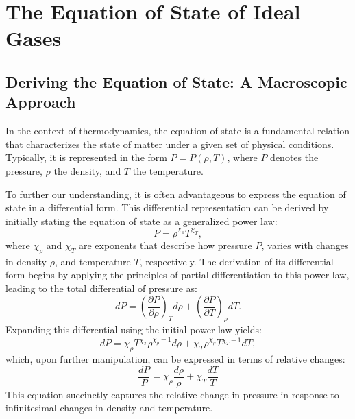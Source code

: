 \documentclass[main.tex]{subfiles}
\begin{document}
\chapter{The Equation of State of Ideal Gases}\label{apx:eos}
    {
        \minitoc
    }
\section{Deriving the Equation of State: A Macroscopic Approach}
In the context of thermodynamics, the equation of state is a fundamental relation that characterizes the state of matter under a given set of physical conditions. Typically, it is represented in the form $P=P(\rho,T)$, where $P$ denotes the pressure, $\rho$ the density, and $T$ the temperature. 

To further our understanding, it is often advantageous to express the equation of state in a differential form. This differential representation can be derived by initially stating the equation of state as a generalized power law:
\begin{equation}
    P = \rho^{\chi_\rho} T^{\chi_T},
\end{equation}
where $\chi_\rho$ and $\chi_T$ are exponents that describe how pressure $P$, varies with changes in density $\rho$, and temperature $T$, respectively. The derivation of its differential form begins by applying the principles of partial differentiation to this power law, leading to the total differential of pressure as:
\begin{equation*}
    dP = \left( \frac{\partial P}{\partial \rho} \right)_T d\rho + \left( \frac{\partial P}{\partial T} \right)_\rho dT.
\end{equation*}
Expanding this differential using the initial power law yields:
\begin{equation*}
    dP = \chi_\rho T^{\chi_T} \rho^{\chi_\rho - 1} d\rho +  \chi_T \rho^{\chi_\rho} T^{\chi_T - 1} dT,
\end{equation*}
which, upon further manipulation, can be expressed in terms of relative changes:
\begin{equation}
    \frac{dP}{P} = \chi_\rho \frac{d\rho}{\rho} + \chi_T \frac{dT}{T}
\end{equation}
This equation succinctly captures the relative change in pressure in response to infinitesimal changes in density and temperature. 
\end{document}
